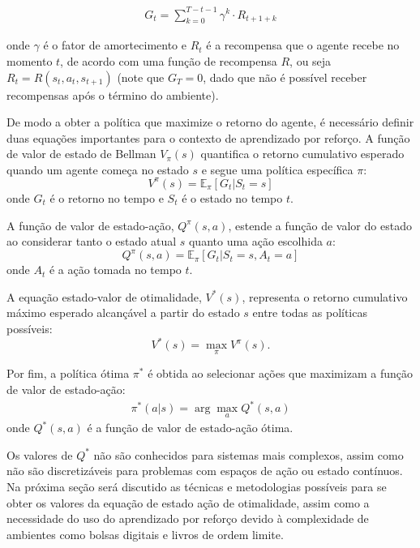 \begin{equation}
	\begin{aligned}
		G_{t} = \sum_{k=0}^{T - t - 1} \gamma^{k} \cdot R_{t + 1 + k}
	\end{aligned}
\end{equation}

onde $\gamma$ é o fator de amortecimento e $R_t$ é a recompensa que o agente recebe no momento $t$, de acordo com uma função de recompensa $R$, ou seja $R_t = R(s_{t}, a_{t}, s_{t + 1})$ (note que $G_{T} = 0$, dado que não é possível receber recompensas após o término do ambiente).

De modo a obter a política que maximize o retorno do agente, é necessário definir duas equações importantes para o contexto de aprendizado por reforço. A função de valor de estado de Bellman \(V_\pi(s)\) quantifica o retorno cumulativo esperado quando um agente começa no estado \(s\) e segue uma política específica \(\pi\):
\[ 
V^{\pi}(s) = \mathbb{E}_\pi[G_t | S_t = s]
\]
onde \(G_t\) é o retorno no tempo e \(S_t\) é o estado no tempo \(t\).

A função de valor de estado-ação, \(Q^\pi(s, a)\), estende a função de valor do estado ao considerar tanto o estado atual \(s\) quanto uma ação escolhida \(a\):
\[ Q^{\pi}(s, a) = \mathbb{E}_\pi[G_t | S_t = s, A_t = a]\]
onde \(A_t\) é a ação tomada no tempo \(t\).

A equação estado-valor de otimalidade, \(V^*(s)\), representa o retorno cumulativo máximo esperado alcançável a partir do estado \(s\) entre todas as políticas possíveis:
\[ V^*(s) = \max_\pi V^{\pi}(s). \]

Por fim, a política ótima $\pi^*$ é obtida ao selecionar ações que maximizam a função de valor de estado-ação:
\begin{equation}
	\begin{aligned}
		\pi^*(a|s) = \arg\max_a Q^*(s, a)
		\label{eq:objective}
	\end{aligned}
\end{equation}
onde \(Q^*(s, a)\) é a função de valor de estado-ação ótima.

Os valores de $Q^{*}$ não são conhecidos para sistemas mais complexos, assim como não são discretizáveis para problemas com espaços de ação ou estado contínuos. Na próxima seção será discutido as técnicas e metodologias possíveis para se obter os valores da equação de estado ação de otimalidade, assim como a necessidade do uso do aprendizado por reforço devido à complexidade de ambientes como bolsas digitais e livros de ordem limite.

